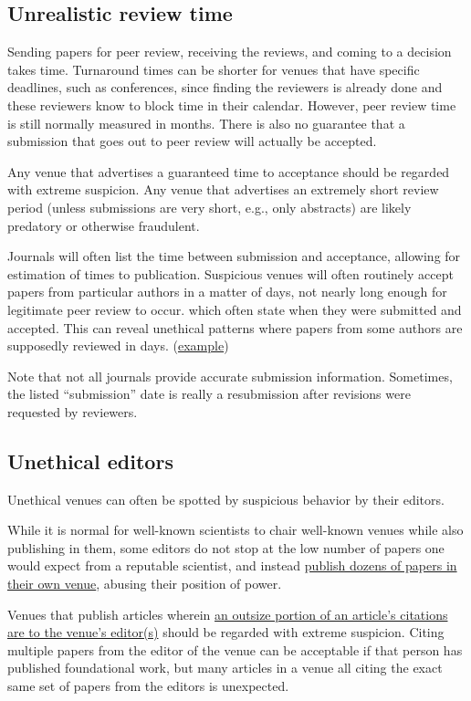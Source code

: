 \documentclass[letterpaper, 12pt]{article}
\begin{document}
\subsection*{Unrealistic review time}

Sending papers for peer review, receiving the reviews, and coming to a decision takes time.
Turnaround times can be shorter for venues that have specific deadlines, such as conferences,
since finding the reviewers is already done and these reviewers know to block time in their calendar.
However, peer review time is still normally measured in months. There is also no guarantee that a submission that goes out to peer review will actually be accepted.

Any venue that advertises a guaranteed time to acceptance should be regarded with extreme suspicion. Any venue that advertises an extremely short review period (unless submissions are very short, e.g., only abstracts) are likely predatory or otherwise fraudulent.

Journals will often list the time between submission and acceptance, allowing for estimation of times to publication. Suspicious venues will often routinely accept papers from particular authors in a matter of days, not nearly long enough for legitimate peer review to occur.
which often state when they were submitted and accepted.
This can reveal unethical patterns where papers from some authors are supposedly reviewed in days.
(\href{https://deevybee.blogspot.com/2015/02/editors-behaving-badly.html}{example})

Note that not all journals provide accurate submission information. Sometimes, the listed ``submission'' date is really a resubmission after revisions were requested by reviewers.

\subsection*{Unethical editors}

Unethical venues can often be spotted by suspicious behavior by their editors.

While it is normal for well-known scientists to chair well-known venues while also publishing in them,
some editors do not stop at the low number of papers one would expect from a reputable scientist,
and instead \href{https://deevybee.blogspot.com/2020/08/pepiops-prolific-editors-who-publish-in.html}{publish dozens of papers in their own venue}, abusing their position of power.

Venues that publish articles wherein \href{https://pubpeer.com/publications/57BB3F8859A0F5BE6FBC4DB70F2E8E}{an outsize portion of an article's citations are to the venue's editor(s)} should be regarded with extreme suspicion. Citing multiple papers from the editor of the venue
can be acceptable if that person has published foundational work,
but many articles in a venue all citing the exact same set of papers from the editors is unexpected.
\end{document}
